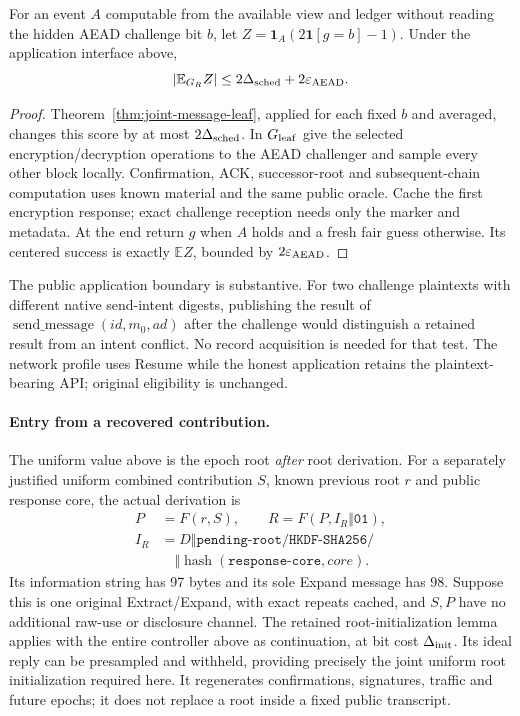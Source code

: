 \begin{corollary}
\label{cor:joint-first-message}
For an event $A$ computable from the available view and ledger without
reading the hidden AEAD challenge bit $b$, let
$Z=\mathbf1_A(2\mathbf1[g=b]-1)$.
Under the application interface above,
\[
 |\mathbb E_{G_R}Z|
 \le 2\Delta_{\rm sched}+2\varepsilon_{\rm AEAD}.
\]
\end{corollary}
\begin{proof}
Theorem~\ref{thm:joint-message-leaf}, applied for each fixed $b$ and
averaged, changes this score by at most $2\Delta_{\rm sched}$.
In $G_{\rm leaf}$ give the selected encryption/decryption operations
to the AEAD challenger and sample every other block locally.
Confirmation, ACK, successor-root and subsequent-chain computation uses
known material and the same public oracle. Cache the first encryption
response; exact challenge reception needs only the marker and metadata.
At the end return $g$ when $A$ holds and a fresh fair guess otherwise.
Its centered success is exactly $\mathbb E Z$, bounded by
$2\varepsilon_{\rm AEAD}$.
\end{proof}

The public application boundary is substantive. For two challenge
plaintexts with different native send-intent digests, publishing the
result of $\operatorname{send\_message}(id,m_0,ad)$ after the challenge
would distinguish a retained result from an intent conflict. No
record acquisition is needed for that test. The network profile uses
Resume while the honest application retains the plaintext-bearing API;
original eligibility is unchanged.

\paragraph{Entry from a recovered contribution.}
The uniform value above is the epoch root \emph{after} root derivation.
For a separately justified uniform combined contribution $S$, known
previous root $r$ and public response core, the actual derivation is
\[
\begin{aligned}
 P&=F(r,S),\qquad R=F(P,I_R\Vert\mathtt{01}),\\
 I_R&=D\Vert\texttt{pending-root/HKDF-SHA256/}\\
    &\quad\Vert\operatorname{hash}(\texttt{response-core},\mathit{core}).
\end{aligned}
\]
Its information string has 97 bytes and its sole Expand message has 98.
Suppose this is one original Extract/Expand, with exact repeats cached,
and $S,P$ have no additional raw-use or disclosure channel.
The retained root-initialization lemma applies with the entire controller
above as continuation, at bit cost $\Delta_{\rm init}$. Its ideal reply
can be presampled and withheld, providing precisely the joint uniform
root initialization required here. It regenerates confirmations,
signatures, traffic and future epochs; it does not replace a root inside
a fixed public transcript.

